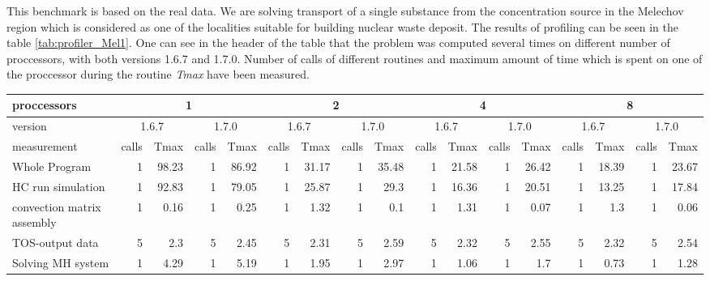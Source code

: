 This benchmark is based on the real data. We are solving transport of a single 
substance from the concentration source in the Melechov region which is considered as
one of the localities suitable for building nuclear waste deposit. The results of profiling can be seen in
the table \ref{tab:profiler_Mel1}. One can see in the header of the table that the problem was computed several times on different 
number of proccessors, with both versions 1.6.7 and 1.7.0. Number of calls of different routines and 
maximum amount of time which is spent on one of the proccessor during the routine \emph{Tmax} have been measured.


\begin{sidewaystable}[!htb]
\scriptsize
\begin{tabular}{|l|r|r|r|r|r|r|r|r|r|r|r|r|r|r|r|r|}
\hline
proccessors                            & \multicolumn{4}{c|}{1} & \multicolumn{4}{c|}{2} & \multicolumn{4}{c|}{4} & \multicolumn{4}{c|}{8} \\
\hline
version                                & \multicolumn{2}{c|}{1.6.7} & \multicolumn{2}{c|}{1.7.0} &  \multicolumn{2}{c|}{1.6.7} & \multicolumn{2}{c|}{1.7.0} &   \multicolumn{2}{c|}{1.6.7} & \multicolumn{2}{c|}{1.7.0} & \multicolumn{2}{c|}{1.6.7} & \multicolumn{2}{c|}{1.7.0}  \\
\hline
measurement                            & calls &  Tmax  & calls  &  Tmax  & calls  &  Tmax  & calls  &  Tmax  & calls  &  Tmax  & calls  &  Tmax  & calls  &  Tmax  & calls  &  Tmax  \\
\hline
Whole Program                          &   1   &   98.23   &   1   &   86.92   &   1   &   31.17   &   1   &   35.48   &   1   &   21.58   &   1   &   26.42   &   1   &   18.39   &   1   &   23.67   \\
 HC run simulation                     &   1   &   92.83   &   1   &   79.05   &   1   &   25.87   &   1   &   29.3    &   1   &   16.36   &   1   &   20.51   &   1   &   13.25   &   1   &   17.84   \\
  convection matrix assembly           &   1   &   0.16    &   1   &   0.25    &   1   &   1.32    &   1   &   0.1 &   1   &   1.31    &   1   &   0.07    &   1   &   1.3 &   1   &   0.06    \\
  TOS-output data                      &   5   &   2.3 &   5   &   2.45    &   5   &   2.31    &   5   &   2.59    &   5   &   2.32    &   5   &   2.55    &   5   &   2.32    &   5   &   2.54    \\
  Solving MH system                    &   1   &   4.29    &   1   &   5.19    &   1   &   1.95    &   1   &   2.97    &   1   &   1.06    &   1   &   1.7 &   1   &   0.73    &   1   &   1.28    \\

\end{tabular}
\end{sidewaystable}
